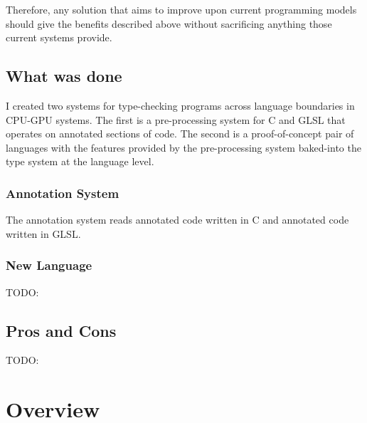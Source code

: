 \documentclass[a4paper,12pt,twoside,openright]{report}
\begin{document}
Therefore, any solution that aims to improve upon current programming models
should give the benefits described above without sacrificing anything those
current systems provide.

\subsection{What was done}

I created two systems for type-checking programs across language boundaries in
CPU-GPU systems. The first is a pre-processing system for C and GLSL that
operates on annotated sections of code. The second is a proof-of-concept pair
of languages with the features provided by the pre-processing system baked-into
the type system at the language level.

\subsubsection{Annotation System}

The annotation system reads annotated code written in C and annotated code
written in GLSL.


\subsubsection{New Language}

TODO:

\subsection{Pros and Cons}

TODO:


\section{Overview}



\end{document}
